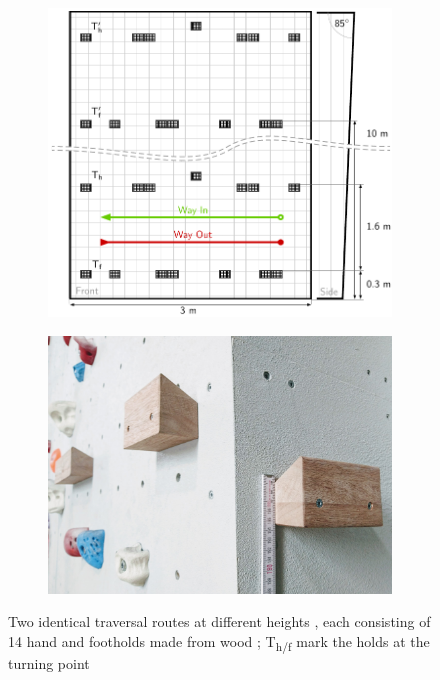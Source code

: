 \begin{figure}[ht]
\begin{subfigure}[t]{.48\textwidth}
		\vspace*{\fill}
		\centering
		\hspace*{-0.8cm}
		\includegraphics[width=\textwidth]{include/images/climbing-wall-schema.pdf}
		\label{fig:climbing-wall-schema}
		\par\vspace*{0.25cm}
		\includegraphics[width=\textwidth]{include/images/hold-photo.jpg}
		\label{fig:hold-photo}
	\end{subfigure}
	\captionsetup{subrefformat=parens}
	\caption[Climbing routes]{Two identical traversal routes at different heights , each consisting of 14 hand and footholds made from wood ; T\textsubscript{h/f} mark the holds at the turning point}
	\label{fig:holds}
\end{figure}